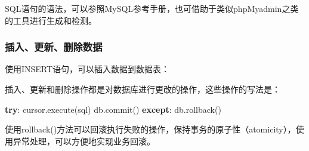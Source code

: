 \documentclass[]{ctexbook}
\newenvironment{Shaded}{\begin{snugshade}}{\end{snugshade}}
\newcommand{\BuiltInTok}[1]{#1}
\newcommand{\CommentTok}[1]{\textcolor[rgb]{0.56,0.35,0.01}{\textit{#1}}}
\newcommand{\ControlFlowTok}[1]{\textcolor[rgb]{0.13,0.29,0.53}{\textbf{#1}}}
\newcommand{\DecValTok}[1]{\textcolor[rgb]{0.00,0.00,0.81}{#1}}
\newcommand{\ExtensionTok}[1]{#1}
\newcommand{\ImportTok}[1]{#1}
\newcommand{\NormalTok}[1]{#1}
\newcommand{\OperatorTok}[1]{\textcolor[rgb]{0.81,0.36,0.00}{\textbf{#1}}}
\newcommand{\SpecialCharTok}[1]{\textcolor[rgb]{0.00,0.00,0.00}{#1}}
\newcommand{\StringTok}[1]{\textcolor[rgb]{0.31,0.60,0.02}{#1}}
\begin{document}
SQL语句的语法，可以参照MySQL参考手册，也可借助于类似phpMyadmin之类的工具进行生成和检测。

\hypertarget{ux63d2ux5165ux66f4ux65b0ux5220ux9664ux6570ux636e}{%
\subsubsection{插入、更新、删除数据}\label{ux63d2ux5165ux66f4ux65b0ux5220ux9664ux6570ux636e}}

使用INSERT语句，可以插入数据到数据表：

\begin{Shaded}
\end{Shaded}

插入、更新和删除操作都是对数据库进行更改的操作，这些操作的写法是：

\begin{Shaded}
\begin{Highlighting}[]
\ControlFlowTok{try}\NormalTok{:}
\NormalTok{    cursor.execute(sql)}
\NormalTok{    db.commit()}
\ControlFlowTok{except}\NormalTok{:}
\NormalTok{    db.rollback()}
\end{Highlighting}
\end{Shaded}

使用rollback()方法可以回滚执行失败的操作，保持事务的原子性（atomicity），使用异常处理，可以方便地实现业务回滚。
\end{document}
